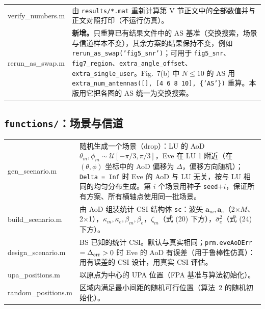\documentclass[11pt,a4paper]{ctexart}
\newcommand{\code}[1]{\texttt{#1}}
\begin{document}
\begin{longtable}{>{\ttfamily\small}p{4.6cm}p{11.2cm}}
verify\_numbers.m & 由 \code{results/*.mat} 重新计算第 V 节正文中的全部数值并与正文对照打印（不运行仿真）。\\
rerun\_as\_swap.m & \textbf{新增。}只重算已有结果文件中的 AS 基准（交换搜索，场景与信道样本不变），其余方案的结果保持不变，例如 \code{rerun\_as\_swap('fig5\_snr')}；可用于 \code{fig5\_snr}、\code{fig7\_region}、\code{extra\_angle\_offset}、\code{extra\_single\_user}。Fig.~7(b) 中 $N\le10$ 的 AS 用 \code{extra\_num\_antennas([], [4 6 8 10], \{'AS'\})} 重算。本版用它把各图的 AS 统一为交换搜索。\\
\bottomrule
\end{longtable}

\subsection{\code{functions/}：场景与信道}
\begin{longtable}{>{\ttfamily\small}p{4.6cm}p{11.2cm}}
\toprule
gen\_scenario.m & 随机生成一个场景（drop）：LU 的 AoD $\theta_m,\phi_m\sim\mathcal U[-\pi/3,\pi/3]$，Eve 在 LU 1 附近（在 $(\theta,\phi)$ 坐标中的 AoD 偏移为 $\Delta$，偏移方向随机）；\code{Delta = Inf} 时 Eve 的 AoD 与 LU 无关，按与 LU 相同的均匀分布生成。第 $i$ 个场景用种子 \code{seed}$+i$，保证所有方案、所有横轴点使用同一批场景。\\
build\_scenario.m & 由 AoD 组装统计 CSI 结构体 \code{sc}：波矢 $\mathbf a_m,\mathbf a_e$（2$\times M$、2$\times$1），$\kappa_m,\kappa_e,\beta_m,\beta_e$，$\zeta_m$（式 (20) 下方），$\bar\sigma_e^2$（式 (24) 下方）。\\
design\_scenario.m & BS 已知的统计 CSI。默认与真实相同；\code{prm.eveAoDErr}$=\Delta_{\rm err}>0$ 时 Eve 的 AoD 有误差（用于鲁棒性仿真）：用有误差的 CSI 设计，用真实 CSI 评估。\\
upa\_positions.m & 以原点为中心的 UPA 位置（FPA 基准与算法初始化）。\\
random\_positions.m & 区域内满足最小间距的随机可行位置（算法~2 的随机初始化）。\\
\bottomrule
\end{longtable}
\end{document}
